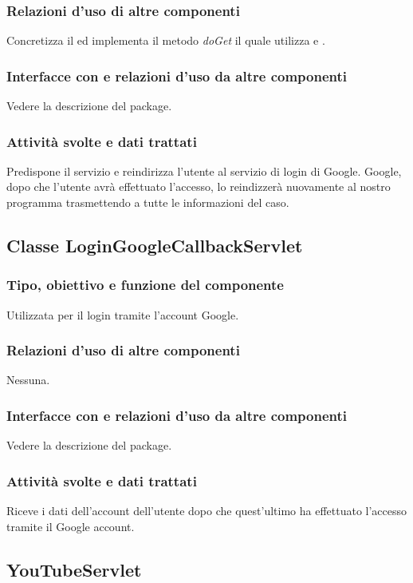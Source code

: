 \subsubsection*{Relazioni d'uso di altre componenti}
Concretizza il  ed implementa il metodo \emph{doGet} il
quale utilizza  e .

\subsubsection*{Interfacce con e relazioni d'uso da altre componenti}
Vedere la descrizione del package.
\subsubsection*{Attivit\`a svolte e dati trattati}
Predispone il servizio e reindirizza l'utente al servizio di login di Google.
Google, dopo che l'utente avr\`a effettuato l'accesso, lo reindizzer\`a nuovamente
al nostro programma trasmettendo a  tutte le
informazioni del caso.


\subsection{Classe LoginGoogleCallbackServlet}
\subsubsection*{Tipo, obiettivo e funzione del componente}
Utilizzata per il login tramite l'account Google.
\subsubsection*{Relazioni d'uso di altre componenti}
Nessuna.
\subsubsection*{Interfacce con e relazioni d'uso da altre componenti}
Vedere la descrizione del package.
\subsubsection*{Attivit\`a svolte e dati trattati}
Riceve i dati dell'account dell'utente dopo che quest'ultimo ha effettuato
l'accesso tramite il Google account.

\subsection{YouTubeServlet} %
